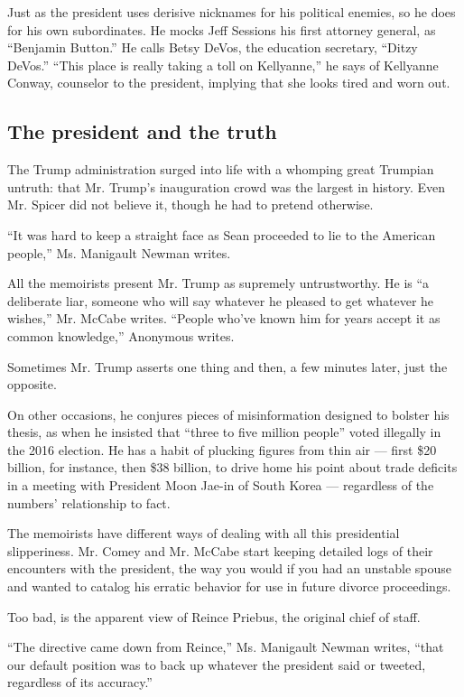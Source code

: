 Just as the president uses derisive nicknames for his political enemies,
so he does for his own subordinates. He mocks Jeff Sessions his first
attorney general, as ``Benjamin Button.'' He calls Betsy DeVos, the
education secretary, ``Ditzy DeVos.'' ``This place is really taking a
toll on Kellyanne,'' he says of Kellyanne Conway, counselor to the
president, implying that she looks tired and worn out.

\hypertarget{the-president-and-the-truth}{%
\subsection{The president and the
truth}\label{the-president-and-the-truth}}

The Trump administration surged into life with a whomping great Trumpian
untruth: that Mr. Trump's inauguration crowd was the largest in history.
Even Mr. Spicer did not believe it, though he had to pretend otherwise.

``It was hard to keep a straight face as Sean proceeded to lie to the
American people,'' Ms. Manigault Newman writes.

All the memoirists present Mr. Trump as supremely untrustworthy. He is
``a deliberate liar, someone who will say whatever he pleased to get
whatever he wishes,'' Mr. McCabe writes. ``People who've known him for
years accept it as common knowledge,'' Anonymous writes.

Sometimes Mr. Trump asserts one thing and then, a few minutes later,
just the opposite.

On other occasions, he conjures pieces of misinformation designed to
bolster his thesis, as when he insisted that ``three to five million
people'' voted illegally in the 2016 election. He has a habit of
plucking figures from thin air --- first \$20 billion, for instance,
then \$38 billion, to drive home his point about trade deficits in a
meeting with President Moon Jae-in of South Korea --- regardless of the
numbers' relationship to fact.

The memoirists have different ways of dealing with all this presidential
slipperiness. Mr. Comey and Mr. McCabe start keeping detailed logs of
their encounters with the president, the way you would if you had an
unstable spouse and wanted to catalog his erratic behavior for use in
future divorce proceedings.

Too bad, is the apparent view of Reince Priebus, the original chief of
staff.

``The directive came down from Reince,'' Ms. Manigault Newman writes,
``that our default position was to back up whatever the president said
or tweeted, regardless of its accuracy.''

